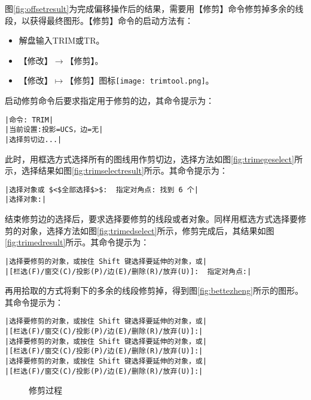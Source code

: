 \begin{procedure}
图\ref{fig:offsetresult}为完成偏移操作后的结果，需要用【修剪】命令修剪掉多余的线段，以获得最终图形。【修剪】命令的启动方法有：
\begin{itemize}
\item 解盘输入TRIM或TR。
\item 【修改】$\rightarrow$【修剪】。
\item 【修改】$\mapsto$【修剪】图标\texttt{[image: trimtool.png]}。
\end{itemize}
启动修剪命令后要求指定用于修剪的边，其命令提示为：
\begin{lstlisting}
|命令: TRIM|
|当前设置:投影=UCS，边=无|
|选择剪切边...|
\end{lstlisting}
此时，用框选方式选择所有的图线用作剪切边，选择方法如图\ref{fig:trimegeselect}所示，选择结果如图\ref{fig:trimselectresult}所示。其命令提示为：
\begin{lstlisting}
|选择对象或 $<$全部选择$>$:  指定对角点: 找到 6 个|
|选择对象:|
\end{lstlisting}
结束修剪边的选择后，要求选择要修剪的线段或者对象。同样用框选方式选择要修剪的对象，选择方法如图\ref{fig:trimedselect}所示，修剪完成后，其结果如图\ref{fig:trimedresult}所示。其命令提示为：
\begin{lstlisting}
|选择要修剪的对象，或按住 Shift 键选择要延伸的对象，或|
|[栏选(F)/窗交(C)/投影(P)/边(E)/删除(R)/放弃(U)]:  指定对角点:|
\end{lstlisting}
再用拾取的方式将剩下的多余的线段修剪掉，得到图\ref{fig:bettezheng}所示的图形。其命令提示为：
\begin{lstlisting}
|选择要修剪的对象，或按住 Shift 键选择要延伸的对象，或|
|[栏选(F)/窗交(C)/投影(P)/边(E)/删除(R)/放弃(U)]:|
|选择要修剪的对象，或按住 Shift 键选择要延伸的对象，或|
|[栏选(F)/窗交(C)/投影(P)/边(E)/删除(R)/放弃(U)]:|
|选择要修剪的对象，或按住 Shift 键选择要延伸的对象，或|
|[栏选(F)/窗交(C)/投影(P)/边(E)/删除(R)/放弃(U)]:|
\end{lstlisting}
\begin{figure}[htbp]
\hspace{20pt}
\hspace{20pt}
\hspace{20pt}
\caption{修剪过程}
\end{figure}
\end{procedure}

